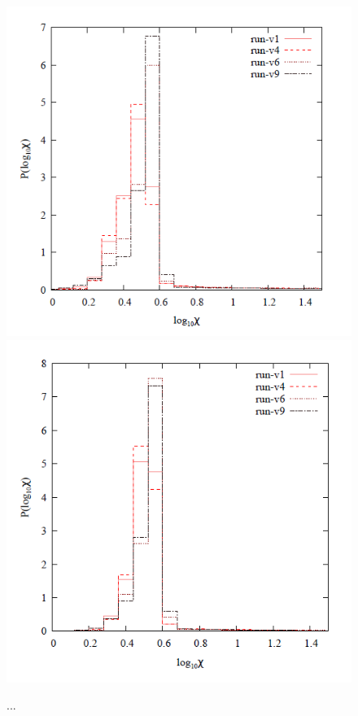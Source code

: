\documentclass[useAMS,usenatbib]{mn2e}
\begin{document}
\begin{figure}
 \includegraphics[scale=0.4,angle=0]{figures/fig4_old.png}
 \includegraphics[scale=0.4,angle=0]{figures/fig5_old.png}
\caption{...}
\label{fig:hists}
\end{figure}
\end{document}
